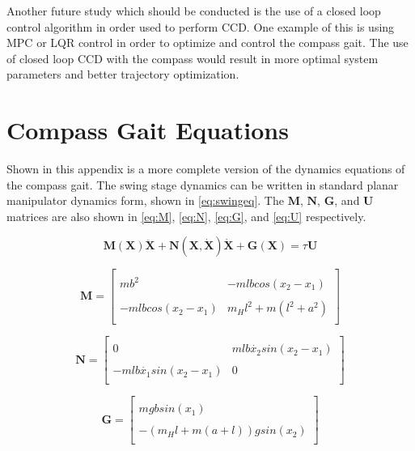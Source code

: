 \documentclass{./springer/svjour3}
\newcommand{\mb}[1]{\mathbf{#1}}
\begin{document}
Another future study which should be conducted is the use of a closed loop control algorithm in order used to perform CCD. One example of this is using 
MPC or LQR control in order to optimize and control the compass gait. The use of closed loop CCD with the compass would result in more optimal system parameters 
and better trajectory optimization. 

\clearpage
\appendix

\section{Compass Gait Equations}

Shown in this appendix is a more complete version of the dynamics equations of the compass gait. The swing stage dynamics can be written in standard planar manipulator 
dynamics form, shown in \ref{eq:swingeq}. The $\mb{M}$, $\mb{N}$, $\mb{G}$, and $\mb{U}$ matrices are also shown in \ref{eq:M}, \ref{eq:N}, \ref{eq:G}, and \ref{eq:U} respectively.

\begin{equation}
\label{eq:swingeq}
\mb{M(X)}\mb{\ddot{X}} + \mb{N(X, \dot{X})}\mb{\dot{X}} + \mb{G(X)} = \tau\mb{U}
\end{equation}

\begin{equation}
\mb{M} = 
\label{eq:M}
\begin{bmatrix}
\\mb^2 &  -mlbcos(x_2 - x_1)\\
\\-mlbcos(x_2 - x_1) &  m_{H}l^2 + m(l^2 + a^2)\\
\end{bmatrix}
\end{equation}

\begin{equation}
\mb{N} = 
\label{eq:N}
\begin{bmatrix}
\\0 &  mlb\dot{x_2}sin(x_2 - x_1)\\
\\-mlb\dot{x_1}sin(x_2 - x_1) &  0\\
\end{bmatrix}
\end{equation}

\begin{equation}
\mb{G} = 
\label{eq:G}
\begin{bmatrix}
\\mgbsin(x_1)\\
\\-(m_{H}l + m(a+l))gsin(x_2)\\
\end{bmatrix}
\end{equation}
\end{document}
